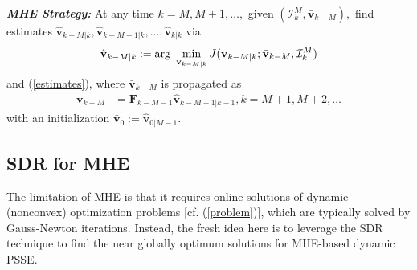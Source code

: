\documentclass[conference]{IEEEtran}
\def\ccalI{{\ensuremath{\mathcal I}}}
\def\bbF{{\ensuremath{\mathbf F}}}
\def\bbv{{\ensuremath{\mathbf v}}}
\begin{document}
{\bf{\emph{MHE Strategy:}}}\label{problem 1} At any time $k=M,M+1,\ldots,$ given $(\ccalI_k^M,\bar{\bbv}_{k-M}),$ find estimates $\hat{\bbv}_{k-M|k},\hat{\bbv}_{k-M+1|k},\ldots,\hat{\bbv}_{k|k}$ via
\begin{equation}
\hat{\bbv}_{k-M|k}:={\rm{arg}}~\mathop{\rm{min}}\limits_{\bbv_{k-M|k}} J(\bbv_{k-M|k};\bar{\bbv}_{k-M},\ccalI_k^M)\label{problem}
\end{equation}
and (\ref{estimates}), where $\bar{\bbv}_{k-M}$ is propagated as
\begin{align}
\bar{\bbv}_{k-M}&=\bbF_{k-M-1}\hat{\bbv}_{k-M-1|k-1}, k=M\!+\!1,M\!+\!2,\ldots
\end{align}
with an initialization $\bar{\bbv}_0:=\hat\bbv_{0|M-1}.$

\subsection{SDR for MHE}

The limitation of MHE is that it requires online solutions of dynamic (nonconvex) optimization problems [cf. (\ref{problem})], which are typically solved by Gauss-Newton iterations. Instead, the fresh idea here is to leverage the SDR technique to find the near globally optimum solutions for MHE-based dynamic PSSE.
\end{document}
